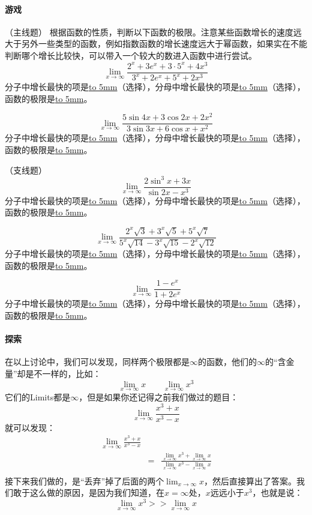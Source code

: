 \documentclass[UTF8]{ctexart}
\begin{document}
\paragraph{游戏}
（主线题）
根据函数的性质，判断以下函数的极限。注意某些函数增长的速度远大于另外一些类型的函数，例如指数函数的增长速度远大于幂函数，如果实在不能判断哪个增长比较快，可以带入一个较大的数进入函数中进行尝试。
\[ {\lim_{x \to \infty} \frac{2^x + 3e^x + 3\cdot5^x+4x^3}{ 3^x + 2e^x + 5^x+2x^3}}\]
分子中增长最快的项是\underline{\hbox to 5mm{}}（选择），分母中增长最快的项是\underline{\hbox to 5mm{}}（选择），函数的极限是\underline{\hbox to 5mm{}}。

\[ {\lim_{x \to \infty} \frac{5\sin{4x} + 3\cos{2x} + 2x^2}{ 3\sin{3x} + 6\cos{x} + x^2}}\]
分子中增长最快的项是\underline{\hbox to 5mm{}}（选择），分母中增长最快的项是\underline{\hbox to 5mm{}}（选择），函数的极限是\underline{\hbox to 5mm{}}。

（支线题）
\[ {\lim_{x \to \infty} \frac{2\sin^3{x} + 3x}{ \sin{2x} - x^3}}\]
分子中增长最快的项是\underline{\hbox to 5mm{}}（选择），分母中增长最快的项是\underline{\hbox to 5mm{}}（选择），函数的极限是\underline{\hbox to 5mm{}}。

\[ {\lim_{x \to \infty} \frac{2^x\sqrt{3} + 3^x\sqrt{5} + 5^x\sqrt{7}}{ 5^x\sqrt{14} - 3^x\sqrt{15} - 2^x\sqrt{12}}}\]
分子中增长最快的项是\underline{\hbox to 5mm{}}（选择），分母中增长最快的项是\underline{\hbox to 5mm{}}（选择），函数的极限是\underline{\hbox to 5mm{}}。

\[ {\lim_{x \to \infty} \frac{1-e^x}{ 1+2e^x}}\]
分子中增长最快的项是\underline{\hbox to 5mm{}}（选择），分母中增长最快的项是\underline{\hbox to 5mm{}}（选择），函数的极限是\underline{\hbox to 5mm{}}。

\paragraph{探索}
在以上讨论中，我们可以发现，同样两个极限都是$\infty$的函数，他们的$\infty$的“含金量”却是不一样的，比如：
\[ {\lim_{x \to \infty} x} \qquad {\lim_{x \to \infty} x^3}\]
它们的Limits都是$\infty$，但是如果你还记得之前我们做过的题目：
\[ {\lim_{x \to \infty} \frac{x^3 + x}{ x^3 - x}}\]
就可以发现：
\begin{eqnarray*}
{\lim_{x \to \infty} \frac{x^3+x}{x^3-x}} \\
& = & \frac{{\lim_{x \to \infty} x^3}+{\lim_{x \to \infty} x}}{{\lim_{x \to \infty} x^3} -{\lim_{x \to \infty} x}}\\
\end{eqnarray*}
接下来我们做的，是“丢弃”掉了后面的两个${\lim_{x \to \infty} x}$，然后直接算出了答案。我们敢于这么做的原因，是因为我们知道，在$x = \infty$处，$x$远远小于$x^3$，也就是说：
\[ {\lim_{x \to \infty} x^3} >> {\lim_{x \to \infty} x} \]
\end{document}
